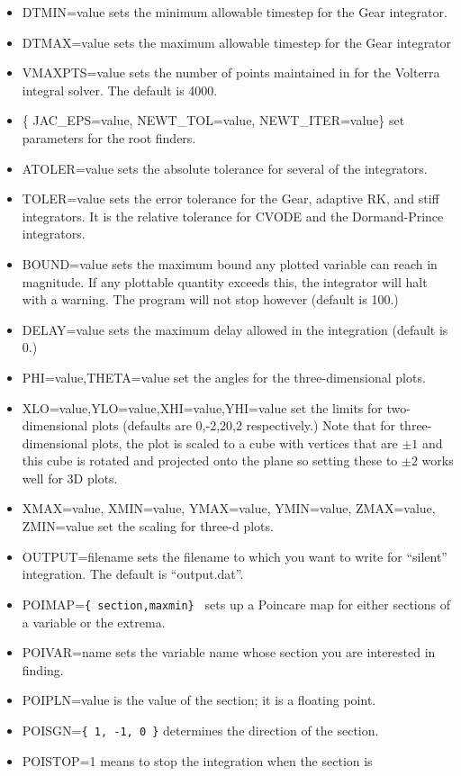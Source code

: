 \documentclass{article}
\begin{document}
\begin{itemize}
\item DTMIN=value sets the minimum allowable timestep for the Gear
integrator.
\item DTMAX=value sets the maximum allowable timestep for the Gear
integrator
\item VMAXPTS=value sets the number of points maintained in for the
Volterra integral solver. The default is 4000.
\item \{ JAC\_EPS=value, NEWT\_TOL=value, NEWT\_ITER=value\} set
parameters for the root finders.
\item ATOLER=value sets the absolute tolerance for several of the 
integrators.
\item TOLER=value sets the error tolerance for the Gear, adaptive RK,
and stiff integrators. It is the relative tolerance for CVODE and the
Dormand-Prince integrators. 
\item BOUND=value sets the maximum bound any plotted variable can
reach in magnitude. If any plottable quantity exceeds this, the
integrator will halt with a warning.  The program will not stop
however (default is 100.)
\item DELAY=value sets the maximum delay allowed in the integration
(default is 0.)
\item PHI=value,THETA=value set the angles for the three-dimensional
plots.
\item XLO=value,YLO=value,XHI=value,YHI=value set the limits for
two-dimensional plots (defaults are 0,-2,20,2 respectively.) Note that
for three-dimensional plots, the plot is scaled to a cube with
vertices that are $\pm1$ and this cube is rotated and projected onto
the plane so setting these to $\pm2$ works well for 3D plots.
\item
XMAX=value, XMIN=value, YMAX=value, YMIN=value, ZMAX=value, ZMIN=value set
the scaling for three-d plots.
\item OUTPUT=filename sets the filename to which you want to write for
``silent'' integration.  The default is ``output.dat''. 
\item POIMAP={\tt \{ section,maxmin\} } sets up a Poincare map for
either sections of a variable or the extrema.  
\item POIVAR=name sets the variable name whose section you are
interested in finding.
\item POIPLN=value is the value of the section; it is a floating
point.
\item POISGN={\tt \{ 1, -1, 0 \}} determines the direction of the
section.  
\item POISTOP=1 means to stop the integration when the section is

\end{itemize}
\end{document}

